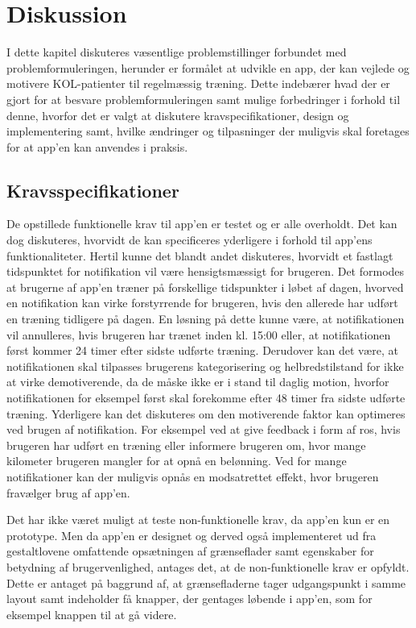 \section{Diskussion}
I dette kapitel diskuteres væsentlige problemstillinger forbundet med problemformuleringen, herunder er formålet at udvikle en app, der kan vejlede og motivere KOL-patienter til regelmæssig træning. Dette indebærer hvad der er gjort for at besvare problemformuleringen samt mulige forbedringer i forhold til denne, hvorfor det er valgt at diskutere kravspecifikationer, design og implementering samt, hvilke ændringer og tilpasninger der muligvis skal foretages for at app’en kan anvendes i praksis.

\subsection{Kravsspecifikationer}
De opstillede funktionelle krav til app’en er testet og er alle overholdt. Det kan dog diskuteres, hvorvidt de kan specificeres yderligere  i forhold til app’ens funktionaliteter. Hertil kunne det blandt andet diskuteres, hvorvidt et fastlagt tidspunktet for notifikation vil være hensigtsmæssigt for brugeren. Det formodes at brugerne af app’en træner på forskellige tidspunkter i løbet af dagen, hvorved en notifikation kan virke forstyrrende for brugeren, hvis den allerede har udført en træning tidligere på dagen. En løsning på dette kunne være, at notifikationen vil  annulleres, hvis brugeren har trænet inden kl. 15:00 eller, at notifikationen først kommer 24 timer efter sidste udførte træning. Derudover kan det være, at notifikationen skal tilpasses brugerens kategorisering og helbredstilstand for ikke at virke demotiverende, da de måske ikke er i stand til daglig motion, hvorfor notifikationen for eksempel først skal forekomme efter 48 timer fra sidste udførte træning. Yderligere kan det diskuteres om den motiverende faktor kan optimeres ved brugen af notifikation. For eksempel ved at give feedback i form af ros, hvis brugeren har udført en træning eller informere brugeren om, hvor mange kilometer brugeren mangler for at opnå en belønning. Ved for mange notifikationer kan der muligvis opnås en modsatrettet effekt, hvor brugeren fravælger brug af app’en. 

Det har ikke været muligt at teste non-funktionelle krav, da app’en kun er en prototype. Men da app’en er designet og derved også implementeret ud fra gestaltlovene omfattende opsætningen af grænseflader samt egenskaber for betydning af brugervenlighed, antages det, at de non-funktionelle krav er opfyldt. Dette er antaget på baggrund af, at grænsefladerne tager udgangspunkt i samme layout samt indeholder få knapper, der gentages løbende i app’en, som for eksempel knappen til at gå videre. 


